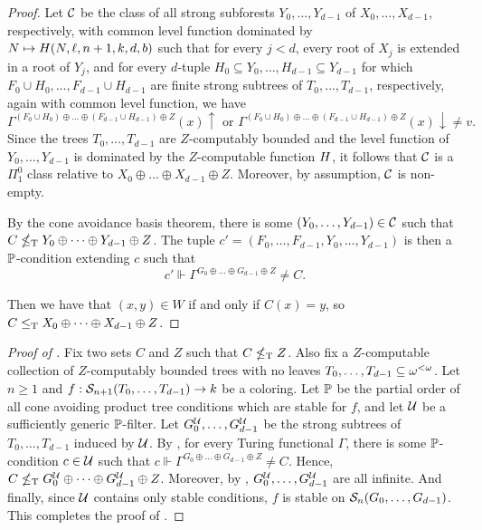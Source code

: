 \begin{proof}
 Let $\mathcal{C}$ be the class of all strong subforests $Y_0, \dots, Y_{d-1}$ of $X_0, \dots, X_{d-1}$, respectively, with common level function dominated by $N \mapsto H(N,\ell,n+1,k,d, b)$ such that for every $j < d$, every root of $X_j$ is extended in a root of $Y_j$, and for every $d$-tuple $H_0 \subseteq Y_0, \dots, H_{d-1} \subseteq Y_{d-1}$
	for which $F_0 \cup H_0, \dots, F_{d-1} \cup H_{d-1}$ are finite strong subtrees of $T_0, \dots, T_{d-1}$, respectively, again with common level function, we have
$$
\Gamma^{(F_0 \cup H_0) \oplus \dots \oplus (F_{d-1} \cup H_{d-1}) \oplus Z}(x) \uparrow \text{ or } \Gamma^{(F_0 \cup H_0) \oplus \dots \oplus (F_{d-1} \cup H_{d-1}) \oplus Z}(x) \downarrow \neq v.
$$
Since the trees $T_0, \dots, T_{d-1}$ are $Z$-computably bounded and the level function of $Y_0, \dots, Y_{d-1}$ is dominated by the $Z$-computable function $H$, it follows that $\mathcal{C}$ is  a $\Pi^0_1$ class relative to $X_0 \oplus \dots \oplus X_{d-1} \oplus Z$. Moreover, by assumption, $\mathcal{C}$ is non-empty.

By the cone avoidance basis theorem, there is some $( Y_0, \dots, Y_{d-1}) \in \mathcal{C}$ such that $C \nleq_{\text{\upshape T}} Y_0 \oplus \dots \oplus Y_{d-1} \oplus Z$. The tuple $c' = (F_0, \dots, F_{d-1}, Y_0, \dots, Y_{d-1})$ is then a $\mathbb{P}$-condition extending $c$ such that
$$
c' \Vdash \Gamma^{G_0 \oplus \dots \oplus G_{d-1} \oplus Z} \neq C.
$$

 Then we have that $(x,y) \in W$ if and only if $C(x) = y$, so $C \leq_{\text{\upshape T}} X_0 \oplus \cdots \oplus X_{d-1} \oplus Z$.
\end{proof}


\begin{proof}[Proof of ]
Fix two sets $C$ and $Z$ such that $C \nleq_{\text{\upshape T}} Z$.
Also fix a $Z$-computable collection of $Z$-computably bounded trees with no leaves $T_0, \dots,\allowbreak T_{d-1} \subseteq {\omega^{<\omega}}$.
 Let $n\geq 1$ and $f: \mathcal{S}_{n+1}({T_0, \dots, T_{d-1}}) \to k$ be a coloring. Let $\mathbb{P}$ be the partial order of all cone avoiding product tree conditions which are stable for $f$, and let $\mathcal{U}$ be a sufficiently generic $\mathbb{P}$-filter.
Let $G^{\mathcal{U}}_0, \dots, G^{\mathcal{U}}_{d-1}$ be the strong subtrees of $T_0, \dots, T_{d-1}$ induced by $\mathcal{U}$. By ,
for every Turing functional $\Gamma$, there is some $\mathbb{P}$-condition $c \in \mathcal{U}$
such that $c \Vdash \Gamma^{G_0 \oplus \dots \oplus G_{d-1} \oplus Z} \neq C$.
Hence, $C \nleq_{\text{\upshape T}} G^{\mathcal{U}}_0 \oplus \dots \oplus G^{\mathcal{U}}_{d-1} \oplus Z$.
Moreover, by , $G^{\mathcal{U}}_0, \dots, G^{\mathcal{U}}_{d-1}$ are all infinite. And finally, since $\mathcal{U}$ contains only stable conditions, $f$ is stable on $\mathcal{S}_{n}({G_0, \dots, G_{d-1}})$.
This completes the proof of .
\end{proof}

